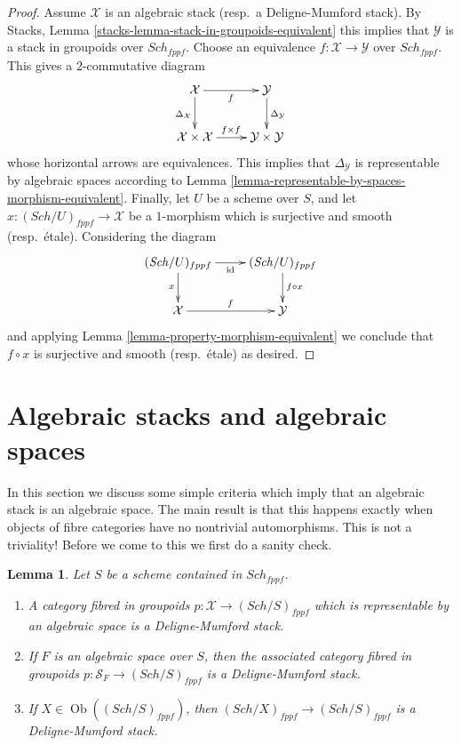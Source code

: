 \documentclass{stacks-project}
\theoremstyle{plain}
\newtheorem{lemma}[subsection]{Lemma}
\theoremstyle{definition}
\theoremstyle{remark}
\numberwithin{equation}{subsection}
\def\Sch{\mathit{Sch}}
\def\Ob{\mathop{\mathrm{Ob}}\nolimits}
\begin{document}
\begin{proof}
Assume $\mathcal{X}$ is an algebraic stack (resp.\ a Deligne-Mumford stack). By
Stacks, Lemma \ref{stacks-lemma-stack-in-groupoids-equivalent}
this implies that $\mathcal{Y}$ is a stack in groupoids over
$\Sch_{fppf}$. Choose an equivalence $f : \mathcal{X} \to \mathcal{Y}$
over $\Sch_{fppf}$. This gives a $2$-commutative diagram
$$
\xymatrix{
\mathcal{X} \ar[r]_f \ar[d]_{\Delta_\mathcal{X}} &
\mathcal{Y} \ar[d]^{\Delta_\mathcal{Y}} \\
\mathcal{X} \times \mathcal{X} \ar[r]^{f \times f} &
\mathcal{Y} \times \mathcal{Y}
}
$$
whose horizontal arrows are equivalences. This implies that
$\Delta_\mathcal{Y}$ is representable by algebraic spaces according to
Lemma \ref{lemma-representable-by-spaces-morphism-equivalent}.
Finally, let $U$ be a scheme over $S$, and let
$x : (\Sch/U)_{fppf} \to \mathcal{X}$ be a $1$-morphism which
is surjective and smooth (resp.\ \'etale). Considering the diagram
$$
\xymatrix{
(\Sch/U)_{fppf} \ar[r]_{\text{id}} \ar[d]_x &
(\Sch/U)_{fppf} \ar[d]^{f \circ x} \\
\mathcal{X} \ar[r]^f &
\mathcal{Y}
}
$$
and applying
Lemma \ref{lemma-property-morphism-equivalent}
we conclude that $f \circ x$ is surjective and smooth (resp.\ \'etale)
as desired.
\end{proof}




\section{Algebraic stacks and algebraic spaces}
\label{section-stacks-spaces}

\noindent
In this section we discuss some simple criteria which imply that an
algebraic stack is an algebraic space. The main result is that this
happens exactly when objects of fibre categories have no nontrivial
automorphisms. This is not a triviality! Before we come to this
we first do a sanity check.

\begin{lemma}
\label{lemma-representable-algebraic}
Let $S$ be a scheme contained in $\Sch_{fppf}$.
\begin{enumerate}
\item A category fibred in groupoids
$p : \mathcal{X} \to (\Sch/S)_{fppf}$
which is representable by an algebraic space is a Deligne-Mumford stack.
\item If $F$ is an algebraic space over $S$, then the associated
category fibred in groupoids
$p : \mathcal{S}_F \to (\Sch/S)_{fppf}$
is a Deligne-Mumford stack.
\item If $X \in \Ob((\Sch/S)_{fppf})$, then
$(\Sch/X)_{fppf} \to (\Sch/S)_{fppf}$ is
a Deligne-Mumford stack.
\end{enumerate}
\end{lemma}
\end{document}
